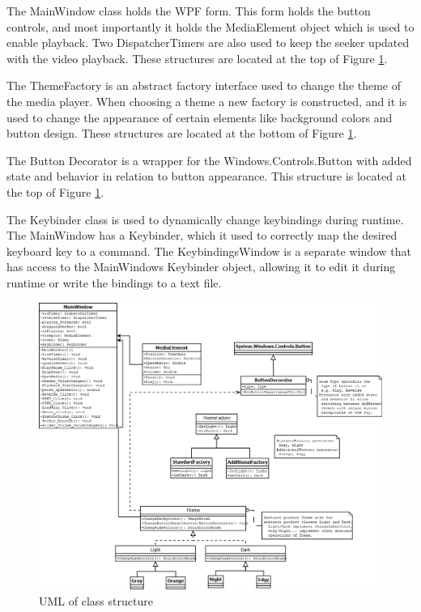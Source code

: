 \documentclass[10pt,conference,onecolumn,compsoc]{IEEEtran}
\begin{document}
The MainWindow class holds the WPF form. This form holds the button controls, and most importantly it holds the MediaElement object which is used to enable playback. Two DispatcherTimers are also used to keep the seeker updated with the video playback. These structures are located at the top of Figure \ref{MainUML}.\par
The ThemeFactory is an abstract factory interface used to change the theme of the media player. When choosing a theme a new factory is constructed, and it is used to change the appearance of certain elements like background colors and button design. These structures are located at the bottom of Figure \ref{MainUML}.\par
The Button Decorator is a wrapper for the Windows.Controls.Button with added state and behavior in relation to button appearance. This structure is located at the top of Figure \ref{MainUML}.\par
The Keybinder class is used to dynamically change keybindings during runtime. The MainWindow has a Keybinder, which it used to correctly map the desired keyboard key to a command. The KeybindingsWindow is a separate window that has access to the MainWindows Keybinder object, allowing it to edit it during runtime or write the bindings to a text file.

\begin{figure}[H]
\begin{center}
\includegraphics[scale=0.4]{MediaPlayerUML.png}
\caption{UML of class structure}
\label{MainUML}
\end{center}
\end{figure}
\end{document}
